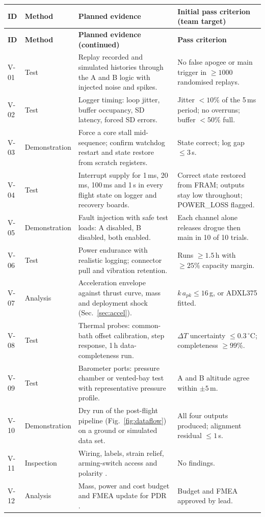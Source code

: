 \small
{}
\begin{longtable}{@{}L{11mm}L{23mm}L{70mm}L{42mm}@{}}
\toprule{}\textbf{ID}&\textbf{Method}&\textbf{Planned evidence}&\textbf{Initial pass criterion (team target)}\\\midrule\endfirsthead
\toprule{}\textbf{ID}&\textbf{Method}&\textbf{Planned evidence (continued)}&\textbf{Pass criterion}\\\midrule\endhead
\bottomrule\endlastfoot
V-01 & Test & Replay recorded and simulated histories through the A and B logic with injected noise and spikes. & No false apogee or main trigger in $\ge1000$ randomised replays.\\
V-02 & Test & Logger timing: loop jitter, buffer occupancy, SD latency, forced SD errors. & Jitter $<10\%$ of the 5\,ms period; no overruns; buffer $<50\%$ full.\\
V-03 & Demonstration & Force a core stall mid-sequence; confirm watchdog restart and state restore from scratch registers. & State correct; log gap $\le3$\,s.\\
V-04 & Test & Interrupt supply for 1\,ms, 20\,ms, 100\,ms and 1\,s in every flight state on logger and recovery boards. & Correct state restored from FRAM; outputs stay low throughout; POWER\_LOSS flagged.\\
V-05 & Demonstration & Fault injection with safe test loads: A disabled, B disabled, both enabled. & Each channel alone releases drogue then main in 10 of 10 trials.\\
V-06 & Test & Power endurance with realistic logging; connector pull and vibration retention. & Runs $\ge1.5$\,h with $\ge25\%$ capacity margin.\\
V-07 & Analysis & Acceleration envelope against thrust curve, mass and deployment shock (Sec.~\ref{sec:accel}). & $k\,a_{pk}\le16$\,g, or ADXL375 fitted.\\
V-08 & Test & Thermal probes: common-bath offset calibration, step response, 1\,h data-completeness run. & $\Delta T$ uncertainty $\le0.3\,^{\circ}$C; completeness $\ge99\%$.\\
V-09 & Test & Barometer ports: pressure chamber or vented-bay test with representative pressure profile. & A and B altitude agree within $\pm5$\,m.\\
V-10 & Demonstration & Dry run of the post-flight pipeline (Fig.~\ref{fig:dataflow}) on a ground or simulated data set. & All four outputs produced; alignment residual $\le1$\,s.\\
V-11 & Inspection & Wiring, labels, strain relief, arming-switch access and polarity \cite{rtc2027app03}. & No findings.\\
V-12 & Analysis & Mass, power and cost budget and FMEA update for PDR \cite{rtc2027app12}. & Budget and FMEA approved by lead.\\
\end{longtable}
\normalsize

